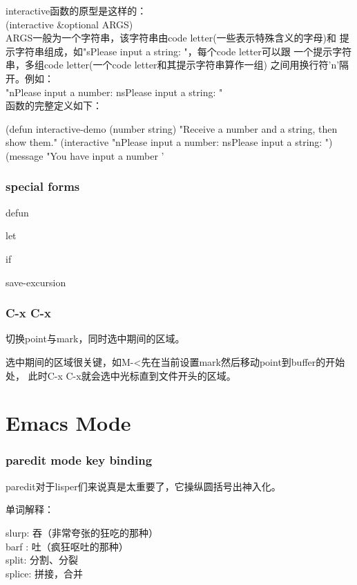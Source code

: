 \documentclass[a4paper,11pt]{article}
\begin{document}
  interactive函数的原型是这样的：\\
  (interactive \&optional ARGS)\\
  ARGS一般为一个字符串，该字符串由code letter(一些表示特殊含义的字母)和
  提示字符串组成，如"sPlease input a string: "，每个code letter可以跟
  一个提示字符串，多组code letter(一个code letter和其提示字符串算作一组)
  之间用换行符'\bs n'隔开。例如：\\
  "nPlease input a number: \bs nsPlease input a string: "\\
  函数的完整定义如下：\\
  \begin{schemecode}
(defun interactive-demo (number string)
  "Receive a number and a string, then show them."
  (interactive "nPlease input a number: \bs nsPlease input a string: ")
  (message "You have input a number '%
  \end{schemecode}

  \section[special forms]{special forms}
  defun

  let

  if

  save-excursion

  \section[C-x C-x]{C-x C-x}
  切换point与mark，同时选中期间的区域。

  选中期间的区域很关键，如M-<先在当前设置mark然后移动point到buffer的开始处，
  此时C-x C-x就会选中光标直到文件开头的区域。


  \part[Emacs Mode]{Emacs Mode}

  \section[paredit mode key binding]{paredit mode key binding}
  paredit对于lisper们来说真是太重要了，它操纵圆括号出神入化。

  单词解释：\par
  slurp: 吞（非常夸张的狂吃的那种）\\
  barf : 吐（疯狂呕吐的那种）\\[10pt]
  split: 分割、分裂\\
  splice: 拼接，合并
  
\end{document}
